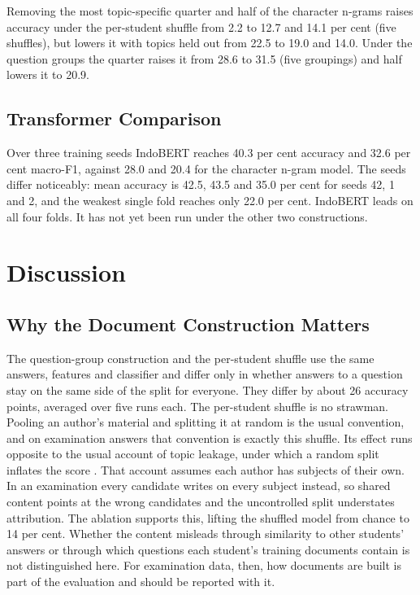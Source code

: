 \documentclass[conference]{IEEEtran}
\begin{document}
Removing the most topic-specific quarter and half of the character n-grams raises accuracy under the per-student shuffle from 2.2 to 12.7 and 14.1 per cent (five shuffles), but lowers it with topics held out from 22.5 to 19.0 and 14.0. Under the question groups the quarter raises it from 28.6 to 31.5 (five groupings) and half lowers it to 20.9.

\subsection{Transformer Comparison}

Over three training seeds IndoBERT reaches 40.3 per cent accuracy and 32.6 per cent macro-F1, against 28.0 and 20.4 for the character n-gram model. The seeds differ noticeably: mean accuracy is 42.5, 43.5 and 35.0 per cent for seeds 42, 1 and 2, and the weakest single fold reaches only 22.0 per cent. IndoBERT leads on all four folds. It has not yet been run under the other two constructions.

\section{Discussion}

\subsection{Why the Document Construction Matters}

The question-group construction and the per-student shuffle use the same answers, features and classifier and differ only in whether answers to a question stay on the same side of the split for everyone. They differ by about 26 accuracy points, averaged over five runs each. The per-student shuffle is no strawman. Pooling an author's material and splitting it at random is the usual convention, and on examination answers that convention is exactly this shuffle. Its effect runs opposite to the usual account of topic leakage, under which a random split inflates the score \cite{Wegmann2022,Altakrori2021}. That account assumes each author has subjects of their own. In an examination every candidate writes on every subject instead, so shared content points at the wrong candidates and the uncontrolled split understates attribution. The ablation supports this, lifting the shuffled model from chance to 14 per cent. Whether the content misleads through similarity to other students' answers or through which questions each student's training documents contain is not distinguished here. For examination data, then, how documents are built is part of the evaluation and should be reported with it.
\end{document}
